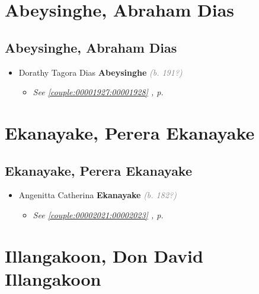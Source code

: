 \documentclass[10pt, openany]{book}
\begin{document}
\part{Abeysinghe, Abraham Dias}
\chapter{Abeysinghe, Abraham Dias}
\label{00001929}
\textcolor{slmaroon}{\textit{}}
\begin{itemize}
\item{Dorathy Tagora Dias \textbf{Abeysinghe} \textcolor{gray}{\textit{(b. 191?)}}
\begin{itemize}
\item{\textcolor{slteal}{\textit{See  \autoref{couple:00001927:00001928} \textit{, p. \pageref{couple:00001927:00001928} }}}}
\end{itemize}
   }
\end{itemize}
  
\part{Ekanayake, Perera Ekanayake}
\chapter{Ekanayake, Perera Ekanayake}
\label{00002024}
\textcolor{slmaroon}{\textit{}}
\begin{itemize}
\item{Angenitta Catherina \textbf{Ekanayake} \textcolor{gray}{\textit{(b. 182?)}}
\begin{itemize}
\item{\textcolor{slteal}{\textit{See  \autoref{couple:00002021:00002023} \textit{, p. \pageref{couple:00002021:00002023} }}}}
\end{itemize}
  }
\end{itemize}
  
\part{Illangakoon, Don David Illangakoon}
\end{document}
